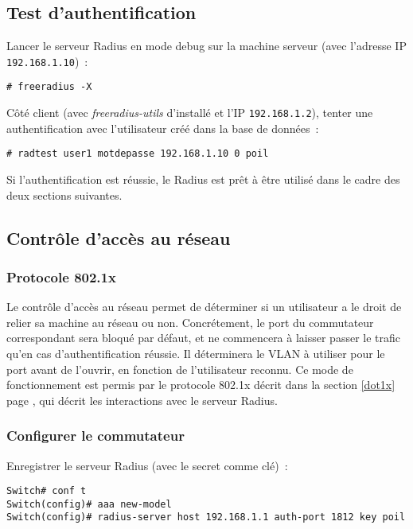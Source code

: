 \subsection{Test d'authentification}

Lancer le serveur Radius en mode debug sur la machine serveur (avec l'adresse IP \texttt{192.168.1.10})~:
\begin{verbatim}
# freeradius -X
\end{verbatim}

Côté client (avec \emph{freeradius-utils} d'installé et l'IP \texttt{192.168.1.2}), tenter une authentification avec l'utilisateur créé dans la base de données~:
\begin{verbatim}
# radtest user1 motdepasse 192.168.1.10 0 poil
\end{verbatim}

Si l'authentification est réussie, le Radius est prêt à être utilisé dans le cadre des deux sections suivantes.

\subsection{Contrôle d'accès au réseau}
\subsubsection{Protocole 802.1x}

Le contrôle d'accès au réseau permet de déterminer si un utilisateur a le droit de relier sa machine au réseau ou non. Concrétement, le port du commutateur correspondant sera bloqué par défaut, et ne commencera à laisser passer le trafic qu'en cas d'authentification réussie. Il déterminera le VLAN à utiliser pour le port avant de l'ouvrir, en fonction de l'utilisateur reconnu. Ce mode de fonctionnement est permis par le protocole 802.1x décrit dans la section \ref{dot1x} page \pageref{dot1x}, qui décrit les interactions avec le serveur Radius.

\subsubsection{Configurer le commutateur}

Enregistrer le serveur Radius (avec le secret comme clé)~:
\begin{verbatim}
Switch# conf t
Switch(config)# aaa new-model
Switch(config)# radius-server host 192.168.1.1 auth-port 1812 key poil
\end{verbatim}

